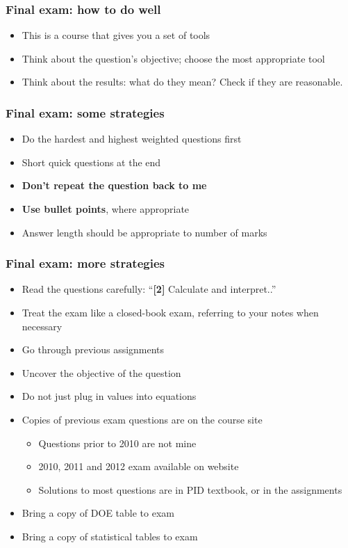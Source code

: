 \begin{frame}\frametitle{Final exam: how to do well}
	\begin{itemize}
		\item	This is a course that gives you a set of tools 
		\item	Think about the question's objective; choose the most appropriate tool 
		\item	Think about the results: what do they mean? Check if they are reasonable. 
	\end{itemize}
\end{frame}

\begin{frame}\frametitle{Final exam: some strategies}
	\begin{itemize}
		\item	Do the hardest and highest weighted questions first 
		\item	Short quick questions at the end 
		\item	\textbf{Don't repeat the question back to me} 
		\item	\textbf{Use bullet points}, where appropriate 
		\item	Answer length should be appropriate to number of marks 
	\end{itemize}
\end{frame}

\begin{frame}\frametitle{Final exam: more strategies}
	\begin{itemize}
		\item	Read the questions carefully: ``\textbf{[2]} Calculate and interpret..''
		\item	Treat the exam like a closed-book exam, referring to your notes when necessary 
		\item	Go through previous assignments 
		\item	Uncover the objective of the question
		\item	Do not just plug in values into equations 
		\item	Copies of previous exam questions are on the course site 
		\begin{itemize}
			\item	Questions prior to 2010 are not mine 
			\item	2010, 2011 and 2012 exam available on website 
			\item	Solutions to most questions are in PID textbook, or in the assignments
		\end{itemize}
	\end{itemize}
	\begin{itemize}
		\item	Bring a copy of DOE table to exam 
		\item	Bring a copy of statistical tables to exam 
	\end{itemize}
\end{frame}

